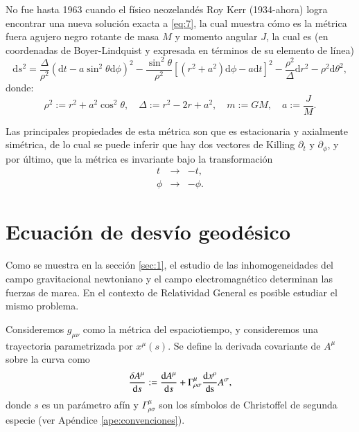 No fue hasta 1963 cuando el físico neozelandés Roy Kerr (1934-ahora) \cite{Heinicke} logra encontrar una nueva solución exacta a \eqref{eq:7}, la cual muestra cómo es la métrica fuera agujero negro rotante de masa $M$ y momento angular $J$, la cual es (en coordenadas de Boyer-Lindquist y expresada en términos de su elemento de línea)
\begin{equation}
\label{eq:8}
\mathrm{d}s^2 = \frac{\Delta}{\rho^2} \left( \mathrm{d}t - a \sin^2 \theta \mathrm{d}\phi \right)^2 - \frac{\sin^2 \theta}{\rho^2} \left[ (r^2 + a^2)\mathrm{d}\phi - a\mathrm{d}t \right]^2 - \frac{\rho^2}{\Delta} \mathrm{d}r^2 - \rho^2 \mathrm{d}\theta^2,
\end{equation}
donde: 
\begin{equation}
\rho^2 := r^2 + a^2 \cos^2 \theta ,\quad \Delta := r^2 - 2r + a^2, \quad m := GM, \quad a := \frac{J}{M}.
\end{equation}

Las principales propiedades de esta métrica son que es estacionaria y axialmente simétrica, de lo cual se puede inferir que hay dos vectores de Killing $\partial_t$ y $\partial_{\phi}$, y por último, que la métrica es invariante bajo la transformación
\begin{eqnarray*}
t &\longrightarrow & -t ,\\
\phi &\longrightarrow & -\phi.
\end{eqnarray*} 

\section{Ecuación de desvío geodésico}

Como se muestra en la sección \ref{sec:1}, el estudio de las inhomogeneidades del campo gravitacional newtoniano y el campo electromagnético determinan las fuerzas de marea. En el contexto de Relatividad General es posible estudiar el mismo problema.

Consideremos $g_{\mu \nu}$ como la métrica del espaciotiempo, y consideremos una trayectoria parametrizada por $x^{\mu}(s)$. Se define la derivada covariante de $A^{\mu}$ sobre la curva como
\begin{equation}
\label{eq:9}
\frac{\delta A^{\mu}}{\mathrm{d}s} := \dv{A^{\mu}}{s} + \Gamma^{\mu}_{\rho \sigma} \dv{x^{\rho}}{ \mathrm{s} } A^{\sigma},
\end{equation}
donde $s$ es un parámetro afín y $\Gamma^{\mu}_{\rho \sigma}$ son los símbolos de Christoffel de segunda especie (ver Apéndice \ref{ape:convenciones}). 

